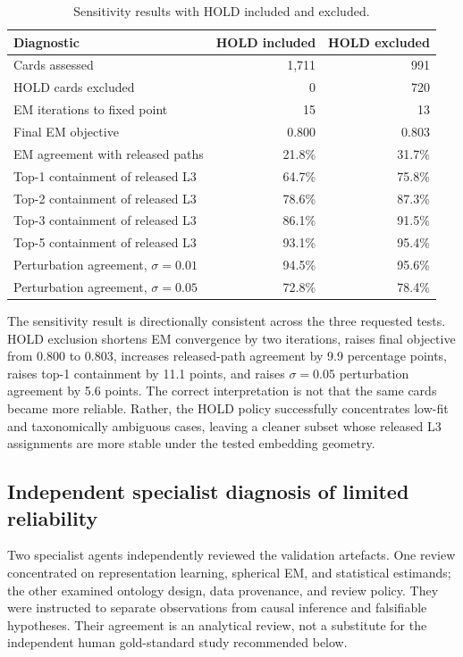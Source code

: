 \documentclass[11pt,a4paper]{article}
\begin{document}
\begin{table}[H]
\centering
\caption{Sensitivity results with HOLD included and excluded.}
\small
\begin{tabular}{lrr}
\toprule
Diagnostic & HOLD included & HOLD excluded \\
\midrule
Cards assessed & 1,711 & 991 \\
HOLD cards excluded & 0 & 720 \\
EM iterations to fixed point & 15 & 13 \\
Final EM objective & 0.800 & 0.803 \\
EM agreement with released paths & 21.8\% & 31.7\% \\
Top-1 containment of released L3 & 64.7\% & 75.8\% \\
Top-2 containment of released L3 & 78.6\% & 87.3\% \\
Top-3 containment of released L3 & 86.1\% & 91.5\% \\
Top-5 containment of released L3 & 93.1\% & 95.4\% \\
Perturbation agreement, $\sigma=0.01$ & 94.5\% & 95.6\% \\
Perturbation agreement, $\sigma=0.05$ & 72.8\% & 78.4\% \\
\bottomrule
\end{tabular}
\end{table}

The sensitivity result is directionally consistent across the three requested
tests. HOLD exclusion shortens EM convergence by two iterations, raises final
objective from 0.800 to 0.803, increases released-path agreement by 9.9
percentage points, raises top-1 containment by 11.1 points, and raises
$\sigma=0.05$ perturbation agreement by 5.6 points. The correct interpretation
is not that the same cards became more reliable. Rather, the HOLD policy
successfully concentrates low-fit and taxonomically ambiguous cases, leaving a
cleaner subset whose released L3 assignments are more stable under the tested
embedding geometry.

\subsection{Independent specialist diagnosis of limited reliability}

Two specialist agents independently reviewed the validation artefacts. One
review concentrated on representation learning, spherical EM, and statistical
estimands; the other examined ontology design, data provenance, and review
policy. They were instructed to separate observations from causal inference
and falsifiable hypotheses. Their agreement is an analytical review, not a
substitute for the independent human gold-standard study recommended below.
\end{document}
